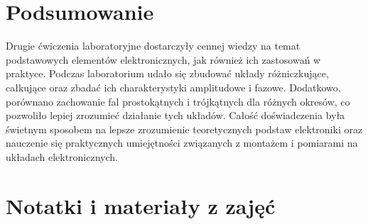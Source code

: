 \documentclass{article}
\begin{document}
  \section{Podsumowanie}
    Drugie ćwiczenia laboratoryjne dostarczyły cennej wiedzy na temat podstawowych elementów elektronicznych, jak również ich zastosowań w praktyce. Podczas laboratorium udało się zbudować układy różniczkujące, całkujące oraz zbadać ich charakterystyki amplitudowe i fazowe. Dodatkowo, porównano zachowanie fal prostokątnych i trójkątnych dla różnych okresów, co pozwoliło lepiej zrozumieć działanie tych układów. Całość doświadczenia była świetnym sposobem na lepsze zrozumienie teoretycznych podstaw elektroniki oraz nauczenie się praktycznych umiejętności związanych z montażem i pomiarami na układach elektronicznych.

  \section{Notatki i materiały z zajęć}
\end{document}

